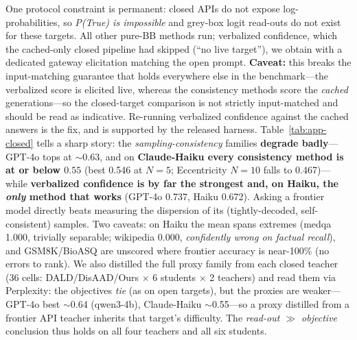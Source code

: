 \documentclass[11pt]{article}
\begin{document}
One protocol constraint is permanent: closed APIs do not expose
log-probabilities, so \emph{P(True) is impossible} and grey-box logit read-outs do not
exist for these targets. All other pure-BB methods run; verbalized confidence, which the
cached-only closed pipeline had skipped (``no live target''), we obtain with a dedicated
gateway elicitation matching the open prompt. \textbf{Caveat:} this breaks the input-matching
guarantee that holds everywhere else in the benchmark---the verbalized score is elicited live,
whereas the consistency methods score the \emph{cached} generations---so the closed-target
comparison is not strictly input-matched and should be read as indicative. Re-running verbalized
confidence against the cached answers is the fix, and is supported by the released harness.
Table~\ref{tab:app-closed} tells a sharp
story: the \emph{sampling-consistency} families \textbf{degrade badly}---GPT-4o tops at
$\sim$0.63, and on \textbf{Claude-Haiku every consistency method is at or below $0.55$}
(best 0.546 at $N{=}5$; Eccentricity $N{=}10$ falls to 0.467)---while \textbf{verbalized
confidence is by far the strongest and, on Haiku, the \emph{only} method that works}
(GPT-4o 0.737, Haiku 0.672). Asking a frontier model directly beats measuring the
dispersion of its (tightly-decoded, self-consistent) samples. Two caveats: on
Haiku the mean spans extremes (medqa 1.000, trivially separable; wikipedia 0.000,
\emph{confidently wrong on factual recall}), and GSM8K/BioASQ are unscored where frontier
accuracy is near-100\% (no errors to rank). We also distilled the full proxy family from
each closed teacher (36 cells: DALD/DisAAD/Ours $\times$ 6 students $\times$ 2 teachers) and
read them via Perplexity: the objectives \emph{tie} (as on open targets), but the proxies
are weaker---GPT-4o best $\sim$0.64 (qwen3-4b), Claude-Haiku $\sim$0.55---so a proxy
distilled from a frontier API teacher inherits that target's difficulty. The
\emph{read-out $\gg$ objective} conclusion thus holds on all four teachers and all six
students.
\end{document}
